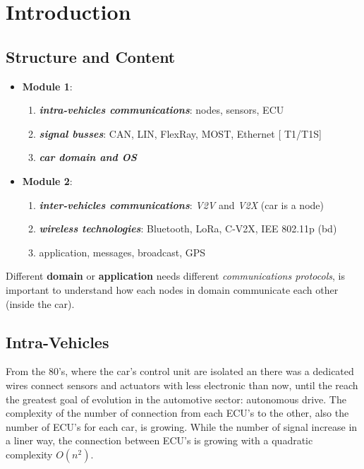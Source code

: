 \chapter{Introduction}

\section{Structure and Content}
\begin{itemize}

    \item \textbf{Module 1}: 
    \begin{enumerate}
        \item \textbf{\textit{intra-vehicles communications}}: nodes, sensors, ECU
        \item \textbf{\textit{signal busses}}: CAN, LIN, FlexRay, MOST, Ethernet [ T1/T1S]
        \item \textbf{\textit{car domain and OS}}
    \end{enumerate}
    
    \item \textbf{Module 2}:
    \begin{enumerate}
        \item \textbf{\textit{inter-vehicles communications}}: \textit{V2V} and \textit{V2X} (car is a node)
        \item \textbf{\textit{wireless technologies}}: Bluetooth, LoRa, C-V2X, IEE 802.11p (bd)
        \item application, messages, broadcast, GPS
    \end{enumerate}

\end{itemize}
Different \textbf{domain} or \textbf{application} needs different \textit{communications protocols}, is important to understand how each nodes in domain communicate each other (inside the car).

\newpage
\section{Intra-Vehicles}
From the 80's, where the car's control unit are isolated an there was a dedicated wires connect sensors and actuators with less electronic than now, until the reach the greatest goal of evolution in the automotive sector: autonomous drive. The complexity of the number of connection from each ECU's to the other, also the number of ECU's for each car, is growing. While the number of signal increase in a liner way, the connection between ECU's is growing with a quadratic complexity $O(n^2)$.

